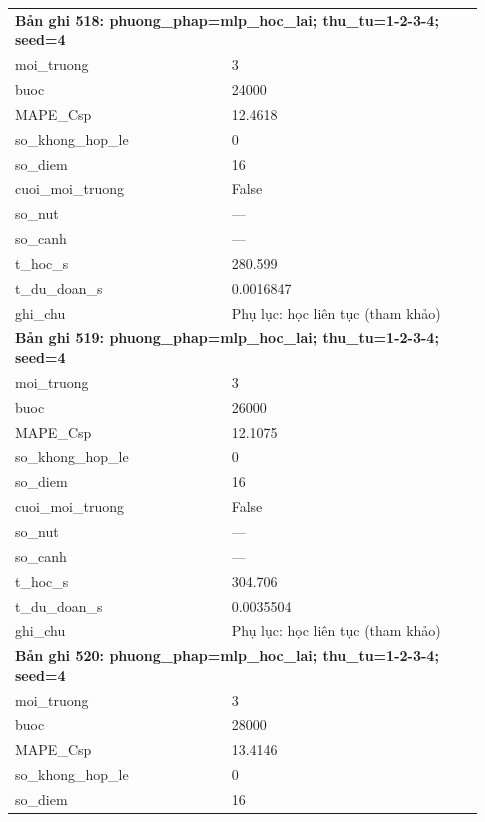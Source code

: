 \begin{longtable}{p{0.43\linewidth}p{0.50\linewidth}}
\midrule
\multicolumn{2}{p{0.95\linewidth}}{\textbf{Bản ghi 518: phuong\_phap=mlp\_hoc\_lai; thu\_tu=1-2-3-4; seed=4}} \\
moi\_\allowbreak truong & 3 \\
buoc & 24000 \\
MAPE\_\allowbreak Csp & 12.4618 \\
so\_\allowbreak khong\_\allowbreak hop\_\allowbreak le & 0 \\
so\_\allowbreak diem & 16 \\
cuoi\_\allowbreak moi\_\allowbreak truong & False \\
so\_\allowbreak nut & — \\
so\_\allowbreak canh & — \\
t\_\allowbreak hoc\_\allowbreak s & 280.599 \\
t\_\allowbreak du\_\allowbreak doan\_\allowbreak s & 0.0016847 \\
ghi\_\allowbreak chu & Phụ lục: học liên tục (tham khảo) \\
\midrule
\multicolumn{2}{p{0.95\linewidth}}{\textbf{Bản ghi 519: phuong\_phap=mlp\_hoc\_lai; thu\_tu=1-2-3-4; seed=4}} \\
moi\_\allowbreak truong & 3 \\
buoc & 26000 \\
MAPE\_\allowbreak Csp & 12.1075 \\
so\_\allowbreak khong\_\allowbreak hop\_\allowbreak le & 0 \\
so\_\allowbreak diem & 16 \\
cuoi\_\allowbreak moi\_\allowbreak truong & False \\
so\_\allowbreak nut & — \\
so\_\allowbreak canh & — \\
t\_\allowbreak hoc\_\allowbreak s & 304.706 \\
t\_\allowbreak du\_\allowbreak doan\_\allowbreak s & 0.0035504 \\
ghi\_\allowbreak chu & Phụ lục: học liên tục (tham khảo) \\
\midrule
\multicolumn{2}{p{0.95\linewidth}}{\textbf{Bản ghi 520: phuong\_phap=mlp\_hoc\_lai; thu\_tu=1-2-3-4; seed=4}} \\
moi\_\allowbreak truong & 3 \\
buoc & 28000 \\
MAPE\_\allowbreak Csp & 13.4146 \\
so\_\allowbreak khong\_\allowbreak hop\_\allowbreak le & 0 \\
so\_\allowbreak diem & 16 \\

\end{longtable}
